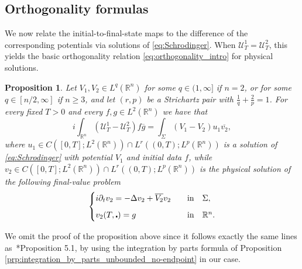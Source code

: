 \documentclass[11pt,a4paper]{amsart}
\newtheorem{proposition}{Proposition}[section]
\theoremstyle{remark}
\theoremstyle{definition}
\newcommand{\R}{\mathbb{R}}
\def\cal{\mathcal}
\def\ovl{\overline}
\def\cd{\centerdot}
\def\d{\partial}
\begin{document}


\subsection{Orthogonality formulas} We now relate the initial-to-final-state maps to the difference of the corresponding potentials via solutions of \eqref{eq:Schrodinger}. When $\mathcal U_T^1=\mathcal U_T^2$, this yields the basic orthogonality relation \eqref{eq:orthogonality_intro} for physical solutions.

\begin{proposition}\label{prp:CR_prop4.1_unbounded}\sl Let $V_1, V_2 \in L^q(\R^n)$ for some $q\in(1,\infty]$ if $n=2$, or for some $q\in[n/2,\infty]$ if $n\geq 3$, and let $(r, p)$ be a Strichartz pair with $\frac{1}{q}+\frac{2}{p}=1$.  For every fixed $T>0$ and every $f, g \in L^2(\R^n)$ we have that 
\[
i\int_{\R^n} (\cal{U}^1_T - \cal{U}^2_T) f\ovl{g} = \int_{\Sigma} (V_1 - V_2) u_1 \ovl{v_2},
\]
where $u_1 \in C([0, T]; L^2 (\R^n)) \cap L^r((0, T); L^p(\R^n))$ is a solution of \eqref{eq:Schrodinger} with potential $V_1$ and initial data $f$, while $v_2 \in C([0, T]; L^2 (\R^n)) \cap L^r((0, T); L^p(\R^n))$ is the physical solution of the following final-value problem 
\begin{equation}\label{eq:FVP}
\begin{cases}
i\d_t v_2 = -\Delta v_2 + \ovl{V_2} v_2 \quad &\mathrm{in} \quad \Sigma,
\vspace{.6em}
\\
v_2(T, \cd) = g  &\mathrm{in} \quad \R^n.
\end{cases}
\end{equation}
\end{proposition}

We omit the proof of the proposition above since it follows exactly the same lines as~\cite{caro2025initialtofinalstateinverseproblemunbounded}*{Proposition 5.1}, by using the integration by parts formula of Proposition \ref{prp:integration_by_parts_unbounded_no-endpoint} in our case. 
\end{document}
